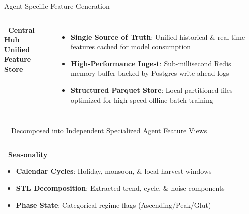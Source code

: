 \documentclass{beamer}
\begin{document}
\begin{frame}{Agent-Specific Feature Generation}
\vspace{-0.25cm}

\begin{herocard}[0.98\textwidth, top=1.5pt, bottom=1.5pt, left=4pt, right=4pt, boxsep=0.5pt]
    \begin{columns}[c]
        \centering
        \textbf{\textcolor{primaryDark}{\small {}~Central Hub}}\\
        \vspace{0.03cm}
        {\scriptsize\color{primaryblue!80}\bfseries Unified Feature Store}
        \fontsize{5.3pt}{6.3pt}\selectfont
        \begin{itemize}\setlength\itemsep{1pt}\setlength\parskip{0pt}
            \item \textbf{Single Source of Truth}: Unified historical \& real-time features cached for model consumption
            \item \textbf{High-Performance Ingest}: Sub-millisecond Redis memory buffer backed by Postgres write-ahead logs
            \item \textbf{Structured Parquet Store}: Local partitioned files optimized for high-speed offline batch training
        \end{itemize}
    \end{columns}
\end{herocard}

\vspace{0.02cm}

{\centering\textcolor{primaryLight}{\fontsize{5pt}{6pt}\selectfont {}~~Decomposed into Independent Specialized Agent Feature Views~~}\par}

\vspace{0.02cm}

\begin{columns}[T]
    \begin{smallcard}[0.98\textwidth, top=1.5pt, bottom=1.5pt, left=3pt, right=3pt, boxsep=0.5pt]
        \centering
        \textbf{\textcolor{accentTeal}{\small {}~Seasonality}}
        \vspace{0.05cm}
        \begin{itemize}\setlength\itemsep{1pt}\setlength\parskip{0pt}
            \tiny
            \item \textbf{Calendar Cycles}: Holiday, monsoon, \& local harvest windows
            \item \textbf{STL Decomposition}: Extracted trend, cycle, \& noise components
            \item \textbf{Phase State}: Categorical regime flags (Ascending/Peak/Glut)
        \end{itemize}
    \end{smallcard}


\end{columns}
\end{frame}
\end{document}
